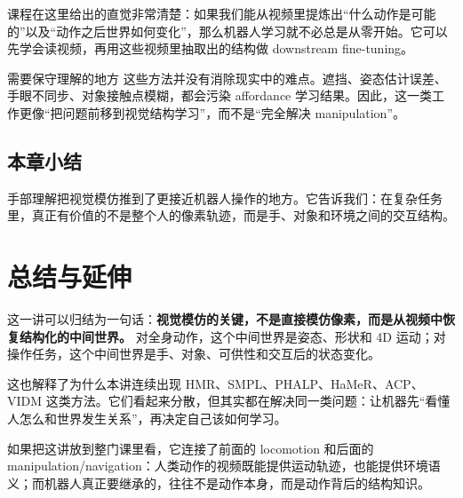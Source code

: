 \documentclass[a4paper]{article}
\begin{document}
课程在这里给出的直觉非常清楚：如果我们能从视频里提炼出“什么动作是可能的”以及“动作之后世界如何变化”，那么机器人学习就不必总是从零开始。它可以先学会读视频，再用这些视频里抽取出的结构做 downstream fine-tuning。

\begin{warningbox}{需要保守理解的地方}
这些方法并没有消除现实中的难点。遮挡、姿态估计误差、手眼不同步、对象接触点模糊，都会污染 affordance 学习结果。因此，这一类工作更像“把问题前移到视觉结构学习”，而不是“完全解决 manipulation”。
\end{warningbox}

\subsection{本章小结}
手部理解把视觉模仿推到了更接近机器人操作的地方。它告诉我们：在复杂任务里，真正有价值的不是整个人的像素轨迹，而是手、对象和环境之间的交互结构。

\section{总结与延伸}
这一讲可以归结为一句话：\textbf{视觉模仿的关键，不是直接模仿像素，而是从视频中恢复结构化的中间世界。} 对全身动作，这个中间世界是姿态、形状和 4D 运动；对操作任务，这个中间世界是手、对象、可供性和交互后的状态变化。

这也解释了为什么本讲连续出现 HMR、SMPL、PHALP、HaMeR、ACP、VIDM 这类方法。它们看起来分散，但其实都在解决同一类问题：让机器先“看懂人怎么和世界发生关系”，再决定自己该如何学习。

如果把这讲放到整门课里看，它连接了前面的 locomotion 和后面的 manipulation/navigation：人类动作的视频既能提供运动轨迹，也能提供环境语义；而机器人真正要继承的，往往不是动作本身，而是动作背后的结构知识。
\end{document}
